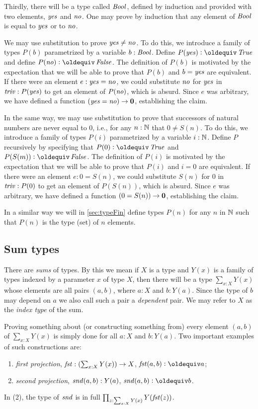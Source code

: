 Thirdly, there will be a type called $\mathop{\mathit{Bool}}$, 
defined by induction and provided with two elements, $\mathop{\mathit{yes}}$ and $\mathop{\mathit{no}}$.  
One may prove by induction
that any element of $\mathop{\mathit{Bool}}$ is equal to $\mathop{\mathit{yes}}$ or to $\mathop{\mathit{no}}$.

We may use substitution to prove $\mathop{\mathit{yes}} \ne \mathop{\mathit{no}}$.  To do this, we introduce a family of types $P(b)$ parametrized by a variable $b:\mathop{\mathit{Bool}}$.
Define $P(\yes) \defeq \true$ and define $P(\no) \defeq \false$.  The definition of $P(b)$ is motivated by the expectation that we will be able
to prove that $P(b)$ and $b = \mathop{\mathit{yes}}$ are equivalent.  If there were an element $e: \mathop{\mathit{yes}} = \mathop{\mathit{no}}$, we could substitute $\mathop{\mathit{no}}$ for $\mathop{\mathit{yes}}$ in $\mathop{\mathit{triv}} :
P (\mathop{\mathit{yes}})$ to get an element of $P(\mathop{\mathit{no}})$, which is absurd.  Since $e$ was arbitrary, we have defined a function $(\mathop{\mathit{yes}}=\mathop{\mathit{no}}) \to \mathbf{0} $,
establishing the claim.

In the same way, we may use substitution to prove that successors of natural numbers are never equal to $0$, i.e., for any $n:\mathbb{N}$ that $0 \ne
S(n)$.  To do this, we introduce a family of types $P(i)$ parametrized by a variable $i:\mathbb{N}$.  Define $P$ recursively by specifying that $P(0)
\defeq \true$ and $P(S(m)) \defeq \false$.  The definition of $P(i)$ is motivated by the expectation that we will be able to prove that $P(i)$
and $i = 0$ are equivalent.  If there were an element $e: 0 = S(n)$, we could substitute $S(n)$ for $0$ in $\mathop{\mathit{triv}} : P ( 0 )$ to get an element
of $P(S(n))$, which is absurd.  Since $e$ was arbitrary, we have defined a function $(0=S(n)) \to \mathbf{0} $, establishing the claim.

In a similar way we will in \cref{sec:typeFin} define types $P(n)$ for any $n$ in $\mathbb{N}$
such that $P(n)$ is the type (set) of $n$ elements.

\subsection{Sum types}
\label{sec:sum-types}
There are \emph{sums} of types.  By this we mean if $X$ is a type and $Y(x)$ is a family of types indexed by a parameter $x$ of type $X$, then
there will be a type $\sum _{x:X} Y(x)$ whose elements are all pairs $(a,b)$, where $a:X$ and $b:Y(a)$. Since the type of $b$ may depend on $a$ we also call such a pair
a \emph{dependent} pair. We may refer to $X$ as the \emph{index
  type} of the sum.  

Proving something about (or constructing something from) every 
element $(a,b)$ of $\sum _{x:X} Y(x)$ is simply done for all $a:X$ and $b: Y(a)$.
Two important examples of such constructions are:
\begin{enumerate}
\item \emph{first projection}, 
$\mathop{\mathit{fst}}:(\sum _{x:X} Y(x)) \to X$, 
$\fst(a,b)\defeq a$;
\item \emph{second projection},
$\mathop{\mathit{snd}}(a,b): Y(a)$,
$\snd(a,b)\defeq b$.
\end{enumerate}
In (2), the type of $\mathop{\mathit{snd}}$ is in full
$\prod_{z:\sum_{x:X} Y(x)} Y(\mathop{\mathit{fst}}(z))$.

